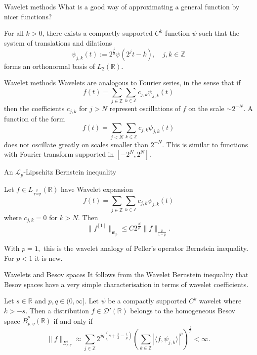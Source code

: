 \documentclass{beamer}
\numberwithin{equation}{section}
\theoremstyle{plain}
\theoremstyle{plain}
\theoremstyle{definition}
\theoremstyle{plain}
\theoremstyle{plain}
\theoremstyle{definition}
\newcommand{\Rl}{\mathbb{R}}
\newcommand{\Itgr}{\mathbb{Z}}
\newcommand{\Dc}{\mathcal{D}}
\newcommand{\Lc}{\mathcal{L}}
\newcommand{\mf}{\mathfrak{m}}
\begin{document}
\begin{frame}{Wavelet methods}
    What is a good way of approximating a general function by nicer functions?
    \begin{theorem}[Daubechies (1988)]
        For all $k>0$, there exists a compactly supported $C^k$ function $\psi$ such that the system of translations
        and dilations
        \begin{equation*}
            \psi_{j,k}(t) := 2^{\frac{j}{2}}\psi(2^jt-k),\quad j,k\in \Itgr
        \end{equation*}
        forms an orthonormal basis of $L_2(\Rl).$
    \end{theorem}
\end{frame}


\begin{frame}{Wavelet methods}
    Wavelets are analogous to Fourier series, in the sense that if
    \[
        f(t) = \sum_{j\in \Itgr} \sum_{k\in \Itgr} c_{j,k}\psi_{j,k}(t)
    \]
    then the coefficients $c_{j,k}$ for $j>N$ represent oscillations of $f$ on the scale $\sim 2^{-N}.$ A function of the form
    \[
        f(t) = \sum_{j<N} \sum_{k\in \Itgr}c_{j,k}\psi_{j,k}(t)
    \]
    does not oscillate greatly on scales smaller than $2^{-N}.$ This is similar to functions with Fourier transform supported in $[-2^N,2^N].$
\end{frame}

\begin{frame}{An $\Lc_p$-Lipschitz Bernstein inequality}
        \begin{theorem}[M.-Sukochev (2022)]
        Let $f\in L_{\frac{p}{1-p}}(\Rl)$ have Wavelet expansion
        \[
            f(t) = \sum_{j\in \Itgr} \sum_{k\in \Itgr} c_{j,k}\psi_{j,k}(t)
        \]
        where $c_{j,k}=0$ for $k>N.$ Then
        \[
            \|f^{[1]}\|_{\mf_p} \leq C2^{\frac{N}{p}} \|f\|_{\frac{p}{1-p}}.
        \]
    \end{theorem}
    With $p=1,$ this is the wavelet analogy of Peller's operator Bernstein inequality. For $p<1$ it is new.
\end{frame}


\begin{frame}{Wavelets and Besov spaces}
    It follows from the Wavelet Bernstein inequality that Besov spaces have a very simple characterisation in terms of wavelet coefficients.
    \begin{theorem}[Meyer (1986)]
        Let $s \in \Rl$ and $p,q\in (0,\infty].$ Let $\psi$ be a compactly supported $C^k$ wavelet where $k > -s.$ Then a distribution $f\in \Dc'(\Rl)$
        belongs to the homogeneous Besov space $\dot{B}^{s}_{p,q}(\Rl)$ if and only if
        \begin{equation*}
            \|f\|_{B^s_{p,q}}\approx \sum_{j\in \Itgr} 2^{jq(s+\frac{1}{2}-\frac{1}{p})}\left(\sum_{k\in \Itgr} |\langle f,\psi_{j,k}\rangle|^p\right)^{\frac{q}{p}} < \infty.
        \end{equation*}
    \end{theorem}
\end{frame}
\end{document}
